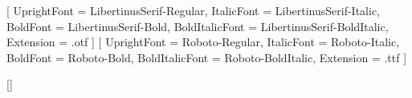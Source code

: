 %
\usepackage{fontspec}
\usepackage[a4paper, top=2.3cm, bottom=2.2cm, left=2.5cm, right=2.5cm,
            headsep=0.7cm, footskip=1.1cm]{geometry}
\usepackage{xcolor}
\usepackage{microtype}
\usepackage{enumitem}
\usepackage{fancyhdr}
\usepackage{titlesec}
\usepackage[most]{tcolorbox}
\usepackage{fontawesome5}
\usepackage{hyperref}


\setmainfont{Libertinus Serif}[
  UprightFont = LibertinusSerif-Regular, ItalicFont = LibertinusSerif-Italic,
  BoldFont = LibertinusSerif-Bold, BoldItalicFont = LibertinusSerif-BoldItalic,
  Extension = .otf ]
\setsansfont{Roboto}[
  UprightFont = Roboto-Regular, ItalicFont = Roboto-Italic,
  BoldFont = Roboto-Bold, BoldItalicFont = Roboto-BoldItalic,
  Extension = .ttf ]

\linespread{1.06}
\setlength{\parskip}{0.55em}
\setlength{\parindent}{0pt}
\setlength{\emergencystretch}{2em}

\titleformat{\section}{\sffamily\bfseries\Large\color{campoazul}}{}{0pt}{}
  [\vspace{-0.45em}{\color{campoamarelo!85!black}\rule{\linewidth}{1.6pt}}]
\titlespacing*{\section}{0pt}{0pt}{0.9em}

